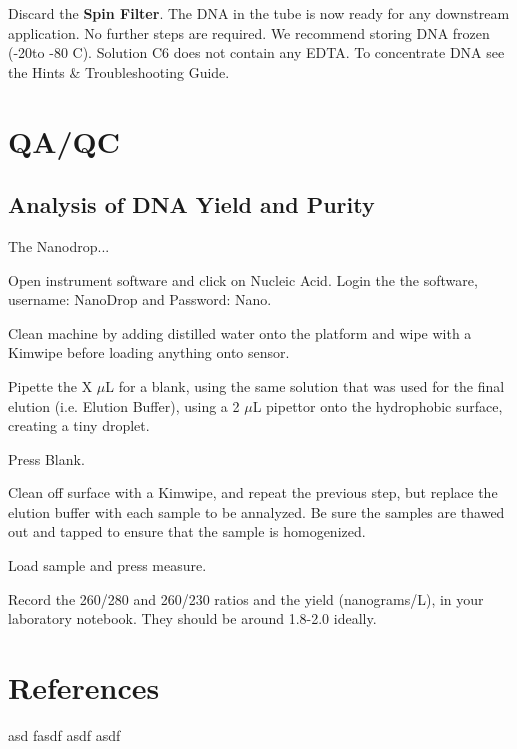 \documentclass[12pt]{../SOP3_alpha}\usepackage[]{graphicx}\usepackage[]{color}
\begin{document}
\NP Discard the \textbf{Spin Filter}. The DNA in the tube is now ready for any downstream application. No further steps are required. We recommend storing DNA frozen (-20\degree to -80 \degree C). Solution C6 does not contain any EDTA. To concentrate DNA see the Hints \& Troubleshooting Guide.

\section{QA/QC}

\subsection*{Analysis of DNA Yield and Purity}

\NP The Nanodrop...

\NP Open instrument software and click on Nucleic Acid. Login the the software, username: NanoDrop and Password: Nano.

\NP Clean machine by adding distilled water onto the platform and wipe with a Kimwipe before loading anything onto sensor. 

\NP Pipette the X $\mu$L for a blank, using the same solution that was used for the final elution (i.e. Elution Buffer), using a 2 $\mu$L pipettor onto the hydrophobic surface, creating a tiny droplet.

\NP Press Blank.

\NP Clean off surface with a Kimwipe, and repeat the previous step, but replace the elution buffer with each sample to be annalyzed. Be sure the samples are thawed out and tapped to ensure that the sample is homogenized.

\NP Load sample and press measure.

\NP Record the 260/280 and 260/230 ratios and the yield (nanograms/L), in your laboratory notebook. They should be around 1.8-2.0 ideally. 


\section{References}

\NP asd fasdf asdf asdf 
\end{document}
